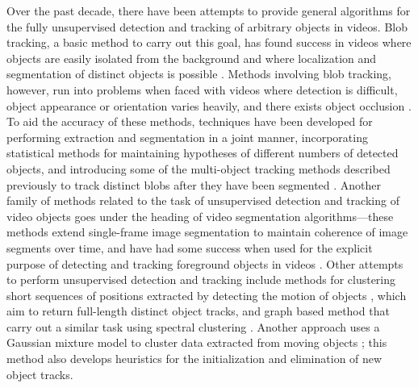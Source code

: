 \documentclass[twocolumn, final]{svjour3}
\begin{document}
Over the past decade, there have been attempts to provide general algorithms for the fully unsupervised detection and tracking of arbitrary objects in videos. Blob tracking, a basic method to carry out this goal, has found success in videos where objects are easily isolated from the background and where localization and segmentation of distinct objects is possible \cite{francois2004real, isard_2001}. Methods involving blob tracking, however, run into problems when faced with videos where detection is difficult, object appearance or orientation varies heavily, and there exists object occlusion \cite{song2005model}. To aid the accuracy of these methods, techniques have been developed for performing extraction and segmentation in a joint manner, incorporating statistical methods for maintaining hypotheses of different numbers of detected objects, and introducing some of the multi-object tracking methods described previously to track distinct blobs after they have been segmented \cite{collins2003mean, isard_2001}. Another family of methods related to the task of unsupervised detection and tracking of video objects goes under the heading of video segmentation algorithms---these methods extend single-frame image segmentation to maintain coherence of image segments over time, and have had some success when used for the explicit purpose of detecting and tracking foreground objects in videos \cite{brox2003unsupervised, sista2000unsupervised, wang1998unsupervised}. Other attempts to perform unsupervised detection and tracking include methods for clustering short sequences of positions extracted by detecting the motion of objects \cite{brostow2006unsupervised, brox2010object}, which aim to return full-length distinct object tracks, and graph based method that carry out a similar task using spectral clustering \cite{fragkiadaki2011detection}. Another approach uses a Gaussian mixture model to cluster data extracted from moving objects \cite{pece_2002}; this method also develops heuristics for the initialization and elimination of new object tracks. 
\end{document}
